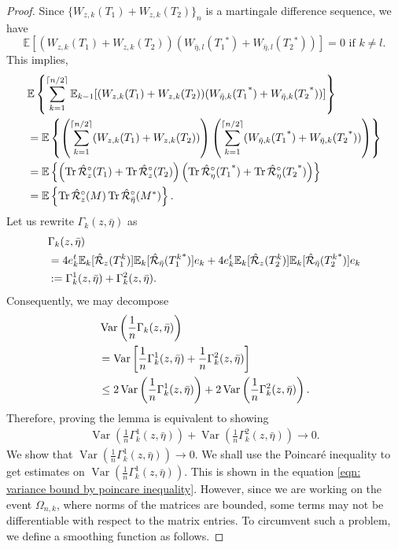 \documentclass[10pt,a4paper]{amsart}
\newcommand{\Tr}{\operatorname{Tr}}
\newcommand{\Var}{\operatorname{Var}}
\newcommand{\conjugate}{{\operatorname{^*}}}
\begin{document}
\begin{proof}
Since $\{W_{z,k}(T_1)+W_{z,k}(T_2)\}_n$ is a martingale difference sequence, we have 
$$ 
\mathbb{E}[(W_{z,k}(T_1)+W_{z,k}(T_2))(W_{\bar{\eta},l}(T_1\conjugate)+W_{\bar{\eta},l}(T_2\conjugate))]=0 \text{ if } k \neq l. $$
This implies,
\begin{align}
    &\mathbb{E}\left\{\sum_{k=1}^{\lceil n/2 \rceil}\mathbb{E}_{k-1}[(W_{z,k}(T_1)+W_{z,k}(T_2))(W_{\bar{\eta},k}(T_1\conjugate)+W_{\bar{\eta},k}(T_2\conjugate))]\right\}\notag\\
    &= \mathbb{E}\left\{\left(\sum_{k=1}^{\lceil n/2 \rceil}(W_{z,k}(T_1)+W_{z,k}(T_2))\right)\left(\sum_{k=1}^{\lceil n/2 \rceil}(W_{\bar{\eta},k}(T_1\conjugate)+W_{\bar{\eta},k}(T_2\conjugate))\right)\right\}\notag\\
    &= \mathbb{E}\left\{\left(\Tr \hat{\mathcal{R}}_z^{\circ}(T_1)+\Tr \hat{\mathcal{R}}_z^{\circ}(T_2)\right)\left(\Tr \hat{\mathcal{R}}_\eta^{\circ}(T_1\conjugate)+\Tr \hat{\mathcal{R}}_\eta^{\circ}(T_2\conjugate)\right)\right\}\notag\\
    &= \mathbb{E}\left\{\Tr \hat{\mathcal{R}}_z^{\circ}(M) \Tr \hat{\mathcal{R}}_{\bar{\eta}}^{\circ}(M^*)\right\}.\notag
\end{align}
Let us rewrite $\Gamma_{k}(z,\bar{\eta})$ as
\begin{align}
    &\Gamma_{k}(z,\bar{\eta})\notag\\
    &=4e_k^t \mathbb{E}_k [\hat{\mathcal{R}}_{z}(T_1^k)]\mathbb{E}_k [\hat{\mathcal{R}}_{\bar{\eta}}(T_1^k\conjugate)]e_k+4e_k^t \mathbb{E}_k [\hat{\mathcal{R}}_{z}(T_2^k)]\mathbb{E}_k [\hat{\mathcal{R}}_{\bar{\eta}}(T_2^k\conjugate)]e_k\notag\\
    &:= \Gamma_{k}^1(z,\bar{\eta})+\Gamma_{k}^2(z,\bar{\eta}).\notag
\end{align}
Consequently, we may decompose
\begin{align}
    &\Var\left(\frac{1}{n}\Gamma_{k}(z,\bar{\eta})\right)\notag\\
    &=\Var\left[\frac{1}{n}\Gamma_{k}^1(z,\bar{\eta})+\frac{1}{n}\Gamma_{k}^2(z,\bar{\eta})\right] \notag\\
    &\leq 2\Var\left(\frac{1}{n}\Gamma_{k}^1(z,\bar{\eta})\right)+2\Var\left(\frac{1}{n}\Gamma_{k}^2(z,\bar{\eta})\right). \notag
\end{align}
Therefore, proving the lemma is equivalent to showing
\begin{align*}
    \Var\left(\frac{1}{n}\Gamma_{k}^1(z,\bar{\eta})\right)+\Var\left(\frac{1}{n}\Gamma_{k}^2(z,\bar{\eta})\right) \rightarrow 0.
\end{align*}
We show that $\Var\left(\frac{1}{n}\Gamma_{k}^1(z,\bar{\eta})\right) \rightarrow 0.$ We shall use the Poincar\'e inequality to get estimates on $\Var\left(\frac{1}{n}\Gamma_{k}^1(z,\bar{\eta})\right).$ This is shown in the equation \eqref{eqn: variance bound by poincare inequality}. However, since we are working on the event $\Omega_{n, k}$, where norms of the matrices are bounded, some terms may not be differentiable with respect to the matrix entries. To circumvent such a problem, we define a smoothing function as follows.


\end{proof}
\end{document}

